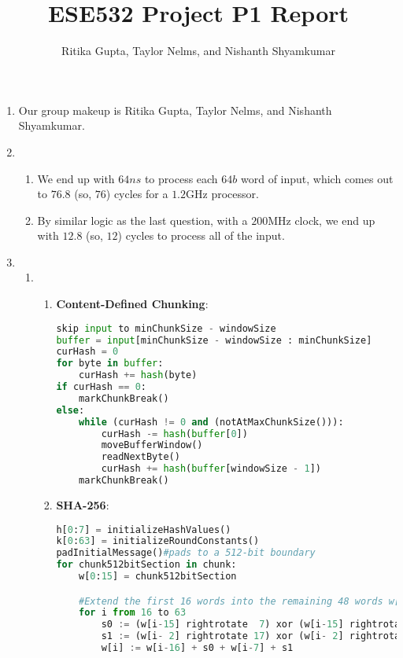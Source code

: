 \documentclass{article}
\title{ESE532 Project P1 Report}
\author{Ritika Gupta, Taylor Nelms, and Nishanth Shyamkumar}
\begin{document}
\maketitle


\begin{enumerate}
\item%
Our group makeup is Ritika Gupta, Taylor Nelms, and Nishanth Shyamkumar.

\item%
\begin{enumerate}[label=(\alph*)]
\item%
We end up with $64ns$ to process each $64b$ word of input, which comes out to $76.8$ (so, $76$) cycles for a $1.2$GHz processor.

\item%
By similar logic as the last question, with a $200$MHz clock, we end up with $12.8$ (so, $12$) cycles to process all of the input.

\end{enumerate}%

\item%
\begin{enumerate}[label=(\alph*)]
\item%
\begin{enumerate}[label=(\roman*)]
\item%
\textbf{Content-Defined Chunking}:
\begin{lstlisting}[language=python]
skip input to minChunkSize - windowSize
buffer = input[minChunkSize - windowSize : minChunkSize]
curHash = 0
for byte in buffer:
    curHash += hash(byte)
if curHash == 0:
    markChunkBreak()
else:
    while (curHash != 0 and (notAtMaxChunkSize())):
        curHash -= hash(buffer[0])
        moveBufferWindow()
        readNextByte()
        curHash += hash(buffer[windowSize - 1])
    markChunkBreak()
\end{lstlisting}
\item%
\textbf{SHA-256}:
\begin{lstlisting}[language=python]
h[0:7] = initializeHashValues()
k[0:63] = initializeRoundConstants()
padInitialMessage()#pads to a 512-bit boundary
for chunk512bitSection in chunk:
    w[0:15] = chunk512bitSection

    #Extend the first 16 words into the remaining 48 words w[16..63] of the message schedule array:
    for i from 16 to 63
        s0 := (w[i-15] rightrotate  7) xor (w[i-15] rightrotate 18) xor (w[i-15] rightshift  3)
        s1 := (w[i- 2] rightrotate 17) xor (w[i- 2] rightrotate 19) xor (w[i- 2] rightshift 10)
        w[i] := w[i-16] + s0 + w[i-7] + s1
    

\end{lstlisting}
\end{enumerate}
\end{enumerate}
\end{enumerate}
\end{document}
